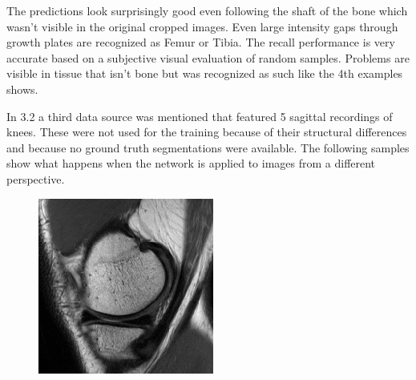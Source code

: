 The predictions look surprisingly good even following the shaft of the bone which wasn't visible in the original cropped images. Even large intensity gaps through growth plates are recognized as Femur or Tibia. The recall performance is very accurate based on a subjective visual evaluation of random samples. Problems are visible in tissue that isn't bone but was recognized as such like the 4th examples shows.

In 3.2 a third data source was mentioned that featured 5 sagittal recordings of knees. These were not used for the training because of their structural differences and because no ground truth segmentations were available. The following samples show what happens when the network is applied to images from a different perspective.

\begin{figure}[H]
  \includegraphics[width=\linewidth]{imgs/transfer_pers_x1.png}
\endminipage\hfill
{}

\end{figure}
